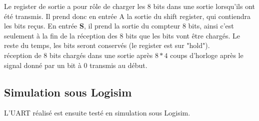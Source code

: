 \documentclass[a4paper]{article} %
\begin{document}
\begin{tcolorbox}[colframe=Monokaimagenta,colback=white]
Le register de sortie a pour rôle de charger les 8 bits dans une sortie lorsqu'ils ont été transmis. Il prend donc en entrée A la sortie du shift register, qui contiendra les bits reçus. En entrée \textbf{S}, il prend la sortie du compteur 8 bits, ainsi c'est seulement à la fin de la réception des 8 bits que les bits vont être chargés. Le reste du temps, les bits seront conservés (le register est sur "hold").\\
réception de 8 bits chargés dans une sortie après $8*4$ coups d'horloge après le signal donné par un bit à $0$ transmis au début.


\end{tcolorbox}

 \subsection{Simulation sous Logisim}
L’UART réalisé est ensuite testé en simulation sous Logisim.
\end{document}
